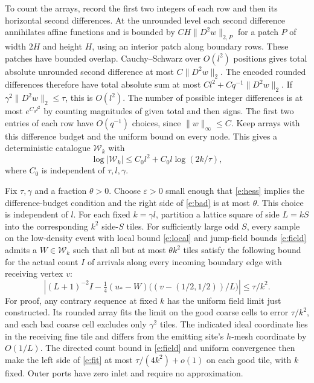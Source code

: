 \documentclass[11pt]{amsart}
\newcommand{\1}{\mathbf 1}
\begin{document}
To count the arrays, record the first two integers of each row and then its horizontal second differences. At the unrounded level each second difference annihilates affine functions and is bounded by \(CH\|D^2w\|_{2,P}\) for a patch \(P\) of width \(2H\) and height \(H\), using an interior patch along boundary rows. These patches have bounded overlap. Cauchy--Schwarz over \(O(l^2)\) positions gives total absolute unrounded second difference at most \(C\|D^2w\|_2\). The encoded rounded differences therefore have total absolute sum at most \(C l^2+Cq^{-1}\|D^2w\|_2\). If \(\gamma^2\|D^2w\|_2\le\tau\), this is \(O(l^2)\). The number of possible integer differences is at most \(e^{C_0 l^2}\) by counting magnitudes of given total and then signs. The first two entries of each row have \(O(q^{-1})\) choices, since \(\|w\|_\infty\le C\). Keep arrays with this difference budget and the uniform bound on every node. This gives a deterministic catalogue \(\mathcal W_k\) with
\begin{equation}\label{e:entropy}
 \log|\mathcal W_k|\le C_0l^2+C_0l\log(2k/\tau),
\end{equation}
where \(C_0\) is independent of \(\tau,l,\gamma\).

Fix \(\tau,\gamma\) and a fraction \(\theta>0\). Choose \(\varepsilon>0\) small enough that \eqref{e:hess} implies the difference-budget condition and the right side of \eqref{e:bad} is at most \(\theta\). This choice is independent of \(l\). For each fixed \(k=\gamma l\), partition a lattice square of side \(L=kS\) into the corresponding \(k^2\) side-\(S\) tiles. For sufficiently large odd \(S\), every sample on the low-density event with local bound \eqref{e:local} and jump-field bounds \eqref{e:field} admits a \(W\in\mathcal W_k\) such that all but at most \(\theta k^2\) tiles satisfy the following bound for the actual count \(I\) of arrivals along every incoming boundary edge with receiving vertex \(v\):
\begin{equation}\label{e:fit}
 \left|(L+1)^{-2} I-\tfrac14(u_*-W)\big((v-(1/2,1/2))/L\big)\right|
      \le \tau/k^2 .
\end{equation}
For proof, any contrary sequence at fixed \(k\) has the uniform field limit just constructed. Its rounded array fits the limit on the good coarse cells to error \(\tau/k^2\), and each bad coarse cell excludes only \(\gamma^2\) tiles. The indicated ideal coordinate lies in the receiving fine tile and differs from the emitting site's \(h\)-mesh coordinate by \(O(1/L)\). The directed count bound in \eqref{e:field} and uniform convergence then make the left side of \eqref{e:fit} at most \(\tau/(4k^2)+o(1)\) on each good tile, with \(k\) fixed. Outer ports have zero inlet and require no approximation.
\end{document}
